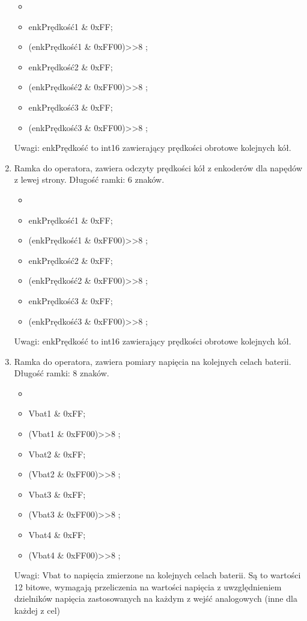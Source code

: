 \documentclass{article}
\begin{document}
\begin{enumerate}
\begin{itemize}
    	\item {}
  		\item enkPrędkość1 \& 0xFF;
  		\item (enkPrędkość1 \& 0xFF00)>>8 ;
  		\item enkPrędkość2 \& 0xFF;
  		\item (enkPrędkość2 \& 0xFF00)>>8 ;
  		\item enkPrędkość3 \& 0xFF;
  		\item (enkPrędkość3 \& 0xFF00)>>8 ;
  		\end{itemize}
    Uwagi: enkPrędkość to int16 zawierający prędkości obrotowe kolejnych kół.
    \item Ramka do operatora, zawiera odczyty prędkości kół z enkoderów dla napędów z lewej strony. Długość ramki: 6 znaków.
    	\begin{itemize}
    	\item {}
  		\item enkPrędkość1 \& 0xFF;
  		\item (enkPrędkość1 \& 0xFF00)>>8 ;
  		\item enkPrędkość2 \& 0xFF;
  		\item (enkPrędkość2 \& 0xFF00)>>8 ;
  		\item enkPrędkość3 \& 0xFF;
  		\item (enkPrędkość3 \& 0xFF00)>>8 ;
  		\end{itemize}
    Uwagi: enkPrędkość to int16 zawierający prędkości obrotowe kolejnych kół.
    \item Ramka do operatora, zawiera pomiary napięcia na kolejnych celach baterii. Długość ramki: 8 znaków.
    	\begin{itemize}
    	\item {}
    	\item Vbat1 \& 0xFF;
  		\item (Vbat1 \& 0xFF00)>>8 ;
  		\item Vbat2 \& 0xFF;
  		\item (Vbat2 \& 0xFF00)>>8 ;
  		\item Vbat3 \& 0xFF;
  		\item (Vbat3 \& 0xFF00)>>8 ;
  		\item Vbat4 \& 0xFF;
  		\item (Vbat4 \& 0xFF00)>>8 ;
    	\end{itemize}
    Uwagi: Vbat to napięcia zmierzone na kolejnych celach baterii. Są to wartości 12 bitowe, wymagają przeliczenia na wartości napięcia z uwzględnieniem dzielników napięcia zastosowanych na każdym z wejść analogowych (inne dla każdej z cel) 

\end{enumerate}
\end{document}
